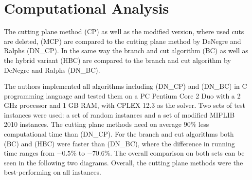 \documentclass{article}
\begin{document}
\section{Computational Analysis}

The cutting plane method (CP) as well as the modified version, where used cuts are deleted, (MCP) are compared to the cutting plane method by DeNegre and Ralphs (DN\_CP).
In the same way the branch and cut algorithm (BC) as well as the hybrid variant (HBC) are compared to the branch and cut algorithm by DeNegre and Ralphs (DN\_BC).

The authors implemented all algorithms including (DN\_CP) and (DN\_BC) in C programming language and tested them on a PC Pentium Core 2 Duo with a 2 GHz processor and 1 GB RAM, with CPLEX 12.3 as the solver. 
Two sets of test instances were used: a set of random instances and a set of modified MIPLIB 2010 instances. 
The cutting plane methods need on average $90\%$ less computational time than (DN\_CP). For the branch and cut algorithms both (BC) and (HBC) were faster than (DN\_BC), where the difference in running time ranges from $-0.5\%$ to $-70.6\%$. The overall comparison on both sets can be seen in the following two diagrams. Overall, the cutting plane methods were the best-performing on all instances.
\end{document}
